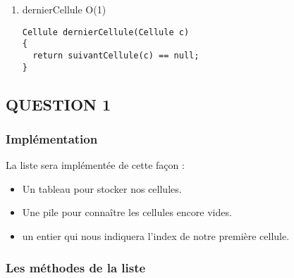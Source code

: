 \documentclass[11pt]{article}
\begin{document}
\begin{enumerate}
\item dernierCellule O(1)
\label{sec:org07a69bd}

\begin{lstlisting}
Cellule dernierCellule(Cellule c)
{
  return suivantCellule(c) == null;
}
\end{lstlisting}
\end{enumerate}


\subsection{QUESTION 1}
\label{sec:org39ab951}

\subsubsection{Implémentation}
\label{sec:org114e5be}
La liste sera implémentée de cette façon :
\begin{itemize}
\item Un tableau pour stocker nos cellules.
\item Une pile pour connaître les cellules encore vides.
\item un entier qui nous indiquera l'index de notre première cellule.
\end{itemize}

\subsubsection{Les méthodes de la liste}
\label{sec:orgcc806d1}
\end{document}
